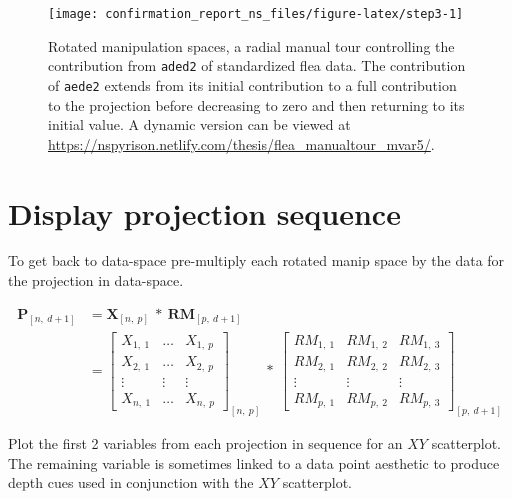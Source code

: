 \documentclass{monashthesis}
\begin{document}
\begin{figure}

{\centering \texttt{[image: confirmation\_report\_ns\_files/figure-latex/step3-1]} 

}

\caption{Rotated manipulation spaces, a radial manual tour
controlling the contribution from \texttt{aded2} of standardized flea
data. The contribution of \texttt{aede2} extends from its initial
contribution to a full contribution to the projection before decreasing
to zero and then returning to its initial value. A dynamic version can
be viewed at
\url{https://nspyrison.netlify.com/thesis/flea_manualtour_mvar5/}.}\label{fig:step3}
\end{figure}

\section{Display projection sequence}\label{sec:display}

To get back to data-space pre-multiply each rotated manip space by the
data for the projection in data-space.

\begin{align}
  \textbf{P}_{[n,~d+1]}
    &= \textbf{X}_{[n,~p]} ~*~ \textbf{RM}_{[p,~d+1]} \\
    &=
      \begin{bmatrix}
          X_{1,~1} & \dots & X_{1,~p} \\
          X_{2,~1} & \dots & X_{2,~p} \\
          \vdots   & \vdots & \vdots  \\
          X_{n,~1} & \dots & X_{n,~p}
      \end{bmatrix}_{[n,~p]}
      ~*~
      \begin{bmatrix}
        RM_{1,~1} & RM_{1,~2} & RM_{1,~3} \\
        RM_{2,~1} & RM_{2,~2} & RM_{2,~3} \\
        \vdots     & \vdots     & \vdots     \\
        RM_{p,~1} & RM_{p,~2} & RM_{p,~3}
      \end{bmatrix}_{[p,~d+1]}
\end{align}

Plot the first 2 variables from each projection in sequence for an
\(XY\) scatterplot. The remaining variable is sometimes linked to a data
point aesthetic to produce depth cues used in conjunction with the
\(XY\) scatterplot.
\end{document}

